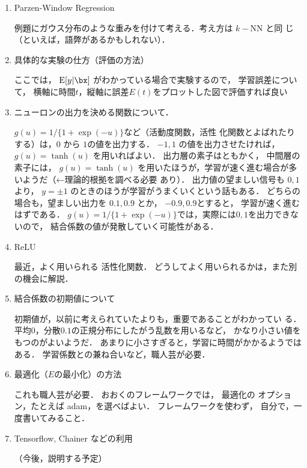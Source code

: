 \documentclass[a4paper,11pt]{jarticle}
\begin{document}
\begin{enumerate}
 \item Parzen-Window Regression

       例題にガウス分布のような重みを付けて考える．考え方は $k-$NN と同
       じ（といえば，語弊があるかもしれない）．

 \item 具体的な実験の仕方（評価の方法）

       ここでは，
       $ {\rm E }  [y | \bx]   $ がわかっている場合で実験するので，
       学習誤差について，
       横軸に時間$t$，縦軸に誤差$E(t)$をプロットした図で評価すれば良い
       
 \item ニューロンの出力を決める関数について．
       
       $g(u) = 1/\{1+\exp(-u)\}$など（活動度関数，活性
       化関数とよばれたりする）は，$0$ から $1$の値を出力する．
       $-1,1$ の値を出力させたければ，
       $g(u) = \tanh (u) $
       を用いればよい．
       出力層の素子はともかく，
       中間層の素子には，
       $g(u) = \tanh (u) $
       を用いたほうが，学習が速く進む場合が多いようだ（←理論的根拠を調べる必要
       あり）．
       出力値の望ましい信号も $0,1$より，
       $ y = \pm 1 $ のときのほうが学習がうまくいくという話もある．
       どちらの場合も，望ましい出力を $0.1,0.9$ とか，
       $-0.9, 0.9$とすると，
       学習が速く進むはずである．
       $g(u) = 1/\{1+\exp(-u)\}$では，実際には$0,1$を出力できないので，
       結合係数の値が発散していく可能性がある．

 \item ReLU

       最近，よく用いられる
       活性化関数．
       どうしてよく用いられるかは，また別の機会に解説．

 \item 結合係数の初期値について

       初期値が，以前に考えられていたよりも，重要であることがわかってい
       る．
       平均$0$，分散$0.1$の正規分布にしたがう乱数を用いるなど，
       かなり小さい値をもつのがよいようだ．
       あまりに小さすぎると，学習に時間がかかるようではある．
       学習係数との兼ね合いなど，職人芸が必要．
              
 \item  最適化（$E$の最小化）の方法

	これも職人芸が必要．
	おおくのフレームワークでは，
	最適化の
	オプション，たとえば adam，を選べばよい．
	フレームワークを使わず，
	自分で，一度書いてみること．
	
\item Tensorflow, Chainer などの利用

      （今後，説明する予定）
\end{enumerate}
\end{document}

